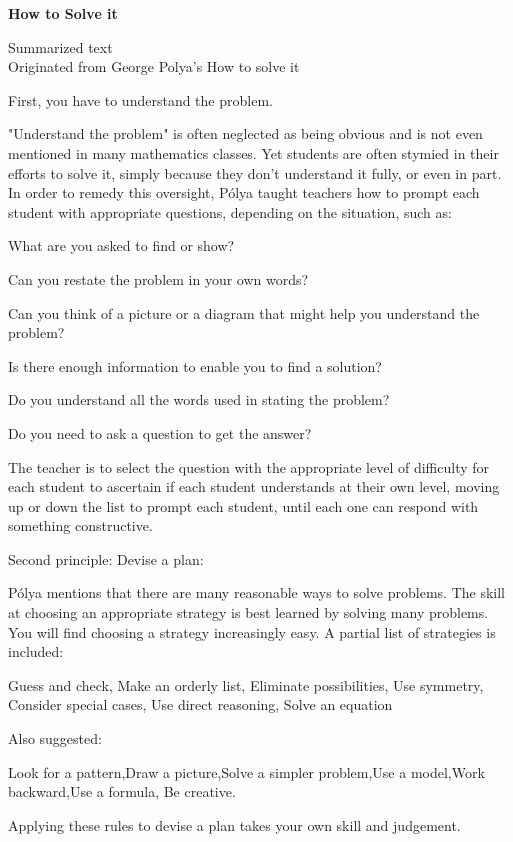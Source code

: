 \begin{pas}
\begin{center}
		\large \textbf{How to Solve it}
	\end{center}
	\begin{center}
		Summarized text\\
		Originated from George Polya's How to solve it 
	\end{center}
	First, you have to understand the problem.
	
	"Understand the problem" is often neglected as being obvious and is not even mentioned in many mathematics classes. Yet students are often stymied in their efforts to solve it, simply because they don't understand it fully, or even in part. In order to remedy this oversight, Pólya taught teachers how to prompt each student with appropriate questions, depending on the situation, such as:
	
	What are you asked to find or show?
	
Can you restate the problem in your own words?

Can you think of a picture or a diagram that might help you understand the problem?

Is there enough information to enable you to find a solution?

Do you understand all the words used in stating the problem?

Do you need to ask a question to get the answer?

The teacher is to select the question with the appropriate level of difficulty for each student to ascertain if each student understands at their own level, moving up or down the list to prompt each student, until each one can respond with something constructive.

Second principle: Devise a plan:

Pólya mentions that there are many reasonable ways to solve problems. The skill at choosing an appropriate strategy is best learned by solving many problems. You will find choosing a strategy increasingly easy. A partial list of strategies is included:

Guess and check, Make an orderly list, Eliminate possibilities, Use symmetry, Consider special cases, Use direct reasoning, Solve an equation

Also suggested:

Look for a pattern,Draw a picture,Solve a simpler problem,Use a model,Work backward,Use a formula, Be creative. 

Applying these rules to devise a plan takes your own skill and judgement.


\end{pas}
